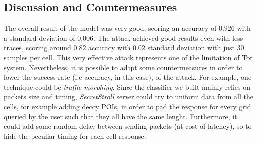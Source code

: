 \documentclass[10pt,conference,compsocconf]{IEEEtran}
\begin{document}
\subsection{Discussion and Countermeasures}
The overall result of the model was very good, scoring an accuracy of $0.926$ with a standard deviation of $0.006$.
The attack achieved good results even with less traces, scoring around $0.82$ accuracy with $0.02$ standard deviation with just 30 samples per cell.
This very effective attack represents one of the limitation of Tor system. Nevertheless, it is possible to adopt some countermeasures in order to lower the success rate (i.e accuracy, in this case), of the attack. For example, one technique could be \textit{traffic morphing}. Since the classifier we built mainly relies on packets size and timing, \textit{SecretStroll} server could try to uniform data from all the cells, for example adding decoy POIs, in order to pad the response for every grid queried by the user such that they all have the same lenght. Furthermore, it could add some random delay between sending packets (at cost of latency), so to hide the peculiar timing for each cell response.



\printbibliography
\end{document}
